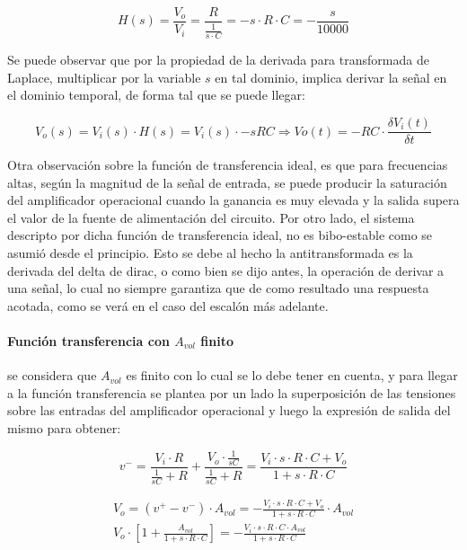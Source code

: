 \begin{equation}
	H(s) = \frac{V_o}{V_i} = \frac{R}{ \frac{1}{s \cdot C}} = -s \cdot R  \cdot C
	= -\frac{s}{10000}
	\label{eq:derivador_transfer_ideal}
\end{equation}

Se puede observar que por la propiedad de la derivada para transformada de Laplace, multiplicar por la variable $s$ en tal dominio, implica derivar la señal en el dominio temporal, de forma tal que se puede llegar:

\begin{equation*}
	V_o(s) = V_i(s) \cdot H(s) = V_i(s) \cdot -sRC \Rightarrow
	Vo(t) = -RC \cdot \frac{\delta V_i(t)}{\delta t}
\end{equation*}

Otra observaci\'on sobre la funci\'on de transferencia ideal, es que para frecuencias altas, seg\'un la magnitud de la se\~nal de entrada, se puede producir la saturaci\'on del amplificador operacional cuando la ganancia es muy elevada y la salida supera el valor de la fuente de alimentaci\'on del circuito. Por otro lado, el sistema descripto por dicha funci\'on de transferencia ideal, no es bibo-estable como se asumi\'o desde el principio. Esto se debe al hecho la antitransformada es la derivada del delta de dirac, o como bien se dijo antes, la operaci\'on de derivar a una se\~nal, lo cual no siempre garantiza que de como resultado una respuesta acotada, como se ver\'a en el caso del escal\'on m\'as adelante.


\paragraph*{Funci\'on transferencia con $A_{vol}$ finito}se considera que $A_{vol}$ es finito con lo cual se lo debe tener en cuenta, y para llegar a la funci\'on transferencia se plantea por un lado la superposici\'on de las tensiones sobre las entradas del amplificador operacional y luego la expresi\'on de salida del mismo para obtener:

\begin{equation*}
	v^{-} = \frac{V_i \cdot R}{\frac{1}{sC} + R} + \frac{V_o \cdot \frac{1}{sC}}{\frac{1}{sC} + R}
	= \frac{V_i \cdot s \cdot R \cdot C + V_o}{1 + s \cdot R \cdot C}
\end{equation*}

\begin{align*}
	V_o = (v^{+} - v^{-}) \cdot A_{vol}
	= - \frac{V_i \cdot s \cdot R \cdot C + V_o}{1 + s \cdot R \cdot C} \cdot A_{vol} \\
	V_o \cdot \left[ 1 + \frac{A_{vol}}{1 + s \cdot R \cdot C} \right]
	= - \frac{V_i \cdot s \cdot R \cdot C \cdot A_{vol}}{1 + s \cdot R \cdot C}
\end{align*}

